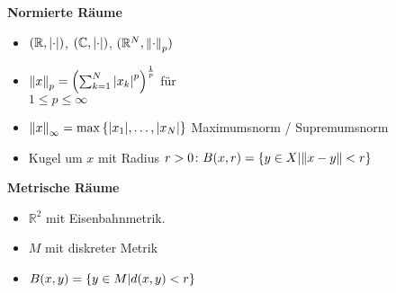 \documentclass{article}
\begin{document}
\begin{minipage}[t]{.4\textwidth}
  \textbf{Normierte Räume} \\
  \begin{itemize}
  \item $(\mathbb{R}, \abs{\cdot})$, $(\mathbb{C}, \abs{\cdot})$, $(\mathbb{R}^N, \norm{\cdot}_p)$
  \item $\norm{x}_p = \qty(\sum_{k = 1}^N \abs{x_k}^p)^{\frac{1}{p}}$ für \\ $1 \leq p \leq \infty$
  \item $\norm{x}_{\infty} = \max\qty{\abs{x_1}, \ldots, \abs{x_N}}$ Maximumsnorm / Supremumsnorm
  \item Kugel um $x$ mit Radius $r > 0 \colon B(x, r) = \qty{y \in X | \norm{x - y} < r}$
  \end{itemize}
\end{minipage} 
\hfill
\vrule
\hfill
\begin{minipage}[t]{.4\textwidth}
  \textbf{Metrische Räume} \\
  \begin{itemize}
  \item $\mathbb{R}^2$ mit Eisenbahnmetrik.
  \item $M$ mit diskreter Metrik
  \item $B(x,y) = \qty{y \in M | d(x,y) < r}$
  \end{itemize}
\end{minipage} \\
\end{document}
